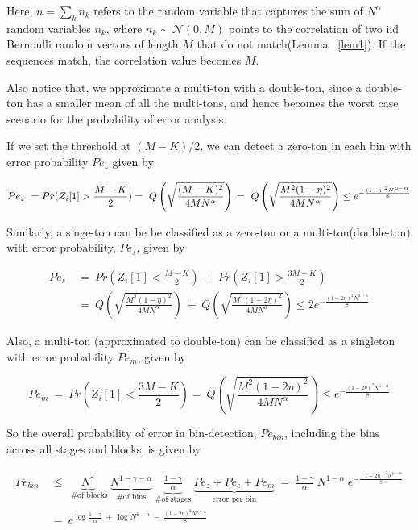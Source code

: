 Here, $n = \sum_k n_k$ refers to the random variable that captures the sum of $N^\alpha$ random variables $n_k$, where $n_k \sim \mathcal{N}(0,M)$ points to the correlation of two iid Bernoulli random vectors of length $M$ that do not match(Lemma ~\ref{lem1}). If the sequences match, the correlation value becomes $M$.  

Also notice that, we approximate a multi-ton with a double-ton, since a double-ton has a smaller mean of all the multi-tons, and hence becomes the worst case scenario for the probability of error analysis.


If we set the threshold at $(M-K)/2$, we can detect a zero-ton in each bin with error probability $Pe_{z}$ given by

\[ 
Pe_{z} \ = Pr(Z_i[1]> \frac{M-K}{2}) =\ Q \left ( \sqrt{\frac{(M-K)^2}{4 M N^{\alpha}}} \right ) \\
           = \ Q \left ( \sqrt{\frac{M^2(1-\eta)^2}{4 M N^{\alpha}}} \right ) \leq e^{- \frac{(1-\eta)^2N^{\mu-\alpha}}{8}}
\]

Similarly, a singe-ton can be be classified as a zero-ton or a multi-ton(double-ton) with error probability, $Pe_{s}$, given by

\[ 
\begin{array}{ll}
 Pe_{s} \  &= \   Pr( Z_i[1] < \frac{M-K}{2}) \  + \ Pr( Z_i[1] > \frac{3M-K}{2}) \\
          &= \   Q \left ( \sqrt{\frac{M^2(1-\eta)^2}{4 M N^{\alpha}}}\right) \ + \ Q \left ( \sqrt{\frac{M^2(1-2\eta)^2}{4 M N^{\alpha}}} \right ) \leq 2 e^{- \frac{(1-2\eta)^2N^{\mu-\alpha}}{8}}
\end{array}
\]

Also, a multi-ton (approximated to double-ton) can be classified as a singleton with error probability $Pe_{m}$, given by

\[ 
Pe_{m} \ = \ Pr( Z_i[1] < \frac{3M-K}{2}) = \  Q \left ( \sqrt{\frac{M^2(1-2\eta)^2}{4 M N^{\alpha}}} \right ) \leq e^{- \frac{(1-2\eta)^2N^{\mu-\alpha}}{8}}
\]

So the overall probability of error in bin-detection, $Pe_{bin}$, including the bins across all stages and blocks, is given by

\[
\begin{array}{ll}
Pe_{bin} & \ \leq \   \underset{\text{ \# of blocks} }{\underbrace{N^{\gamma}}} \
\underset{\text{\# of bins} } {\underbrace{N^{1-\gamma-\alpha}}} \
\underset{\text{\# of stages} }
{\underbrace{\frac{1-\gamma}{\alpha}}} \  
\underset{\text{error per bin}}
{\underbrace{Pe_{z}+Pe_{s}+Pe_{m}}} \ = \ \frac{1-\gamma }{\alpha} \ N^{1-\alpha} \  e^{- \frac{(1-2\eta)^2N^{\mu-\alpha}}{8}} \\
& \ =  \ e^{\log \frac{1-\gamma }{\alpha} \ + \ \log N^{1-\alpha} \  - \ \frac{(1-2\eta)^2N^{\mu-\alpha}}{8}} 
\end{array}
\] 

